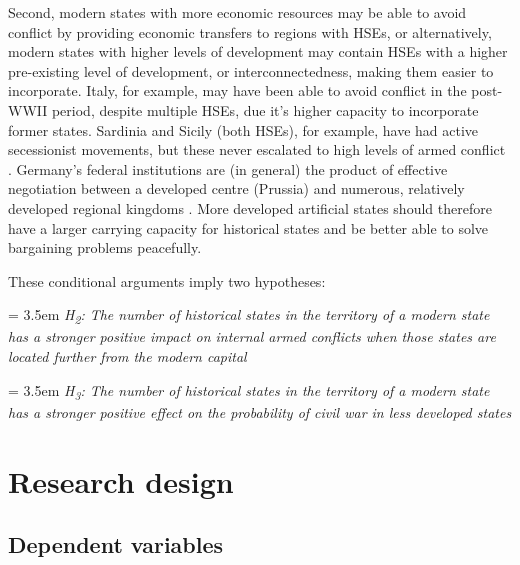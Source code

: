 Second, modern states with more economic resources may be able to avoid conflict
by providing economic transfers to regions with HSEs, or alternatively, modern
states with higher levels of development may contain HSEs with a higher
pre-existing level of development, or interconnectedness, making them easier to
incorporate. Italy, for example, may have been able to avoid conflict in the
post-WWII period, despite multiple HSEs, due it's higher capacity to incorporate
former states. Sardinia and Sicily (both HSEs), for example, have had active
secessionist movements, but these never escalated to high levels of armed
conflict \citep{Griffiths2016}. Germany's federal institutions are (in general)
the product of effective negotiation between a developed centre (Prussia) and
numerous, relatively developed regional kingdoms \citep{Ziblatt2008}.  More
developed artificial states should therefore have a larger carrying capacity for
historical states and be better able to solve bargaining problems peacefully.  

These conditional arguments imply two hypotheses:

\hangindent = 3.5em \textit{H\textsubscript{2}: The number of historical states
in the territory of a modern state has a stronger positive impact on internal
armed conflicts when those states are located further from the modern capital}

\bigskip

\hangindent = 3.5em \textit{H\textsubscript{3}: The number of historical states
in the territory of a modern state has a stronger positive effect on the
probability of civil war in less developed states}

\bigskip

 
\section{Research design}

\subsection{Dependent variables}

